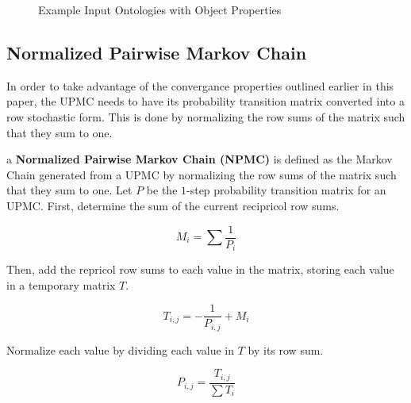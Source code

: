 \documentclass[letterpaper,twocolumn,12pt]{article}
\begin{document}
\begin{figure*}
\centering
\SetVertexNormal[
	Shape = circle,
    LineWidth = 1pt
]
\SetUpEdge[
	lw = 1pt,
    color = orange,
    labelcolor = white
]
\caption{Example Input Ontologies with Object Properties}
\label{fig:input}
\end{figure*}

\subsection{Normalized Pairwise Markov Chain}

In order to take advantage of the convergance properties outlined earlier in this paper, the UPMC needs to have its probability transition matrix converted into a row stochastic form. 
This is done by normalizing the row sums of the matrix such that they sum to one.

\begin{defn}
\label{def:npmc}
a {\bf Normalized Pairwise Markov Chain (NPMC)} is defined as the Markov Chain generated from a UPMC by normalizing the row sums of the matrix such that they sum to one. Let $P$ be the $1$-step probability transition matrix for an UPMC. 
First, determine the sum of the current recipricol row sums.

$$ M_i = \sum \frac{1}{P_i} $$

\noindent Then, add the repricol row sums to each value in the matrix, storing each value in a temporary matrix $T$.

$$ T_{i,j} = -\frac{1}{P_{i,j}} + M_i $$

\noindent Normalize each value by dividing each value in $T$ by its row sum.

$$ P_{i,j} = \frac{T_{i,j}}{\sum T_i} $$
\end{defn}
\end{document}

